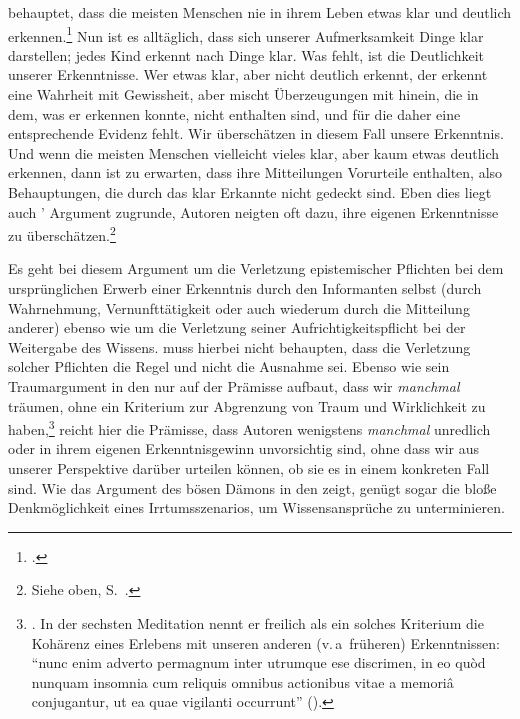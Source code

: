 \begin{nummerierung}
  behauptet, dass die meisten Menschen nie in ihrem Leben etwas
 klar und deutlich
 erkennen.\footnote{\cite[Vgl.][VIII: 22]{Descartes:OeuvresdeDescartes1983}.}
 Nun ist es alltäglich, dass sich unserer Aufmerksamkeit Dinge klar darstellen; jedes Kind erkennt nach
  Dinge klar. Was fehlt, ist die Deutlichkeit unserer
 Erkenntnisse. Wer etwas klar, aber nicht deutlich erkennt, der erkennt eine
 Wahrheit mit Gewissheit, aber mischt Überzeugungen mit hinein, die in dem, was
 er erkennen konnte, nicht enthalten sind, und für die daher eine entsprechende
 Evidenz fehlt. Wir überschätzen in diesem Fall unsere Erkenntnis. Und wenn die
 meisten Menschen vielleicht vieles klar, aber kaum etwas deutlich erkennen,
 dann ist zu erwarten, dass ihre Mitteilungen Vorurteile enthalten, also
 Behauptungen, die durch das klar Erkannte nicht gedeckt sind. Eben dies liegt
 auch ' Argument zugrunde, Autoren neigten oft dazu, ihre
 eigenen Erkenntnisse zu überschätzen.\footnote{Siehe oben,
 S.~\pageref{Abschnitt:DescartesunddieUeberinterpretation}.}
 
 Es geht bei diesem Argument um die Verletzung epistemischer Pflichten bei dem
 ursprünglichen Erwerb einer Erkenntnis durch den Informanten selbst (durch
 Wahrnehmung, Vernunfttätigkeit oder auch wiederum durch die Mitteilung anderer)
 ebenso wie um die Verletzung seiner Aufrichtigkeitspflicht bei der Weitergabe
 des Wissens.  muss hierbei nicht behaupten, dass die
 Verletzung solcher Pflichten die Regel und nicht die Ausnahme sei. Ebenso wie sein
 Traumargument in den  nur auf der
 Prämisse aufbaut, dass wir \emph{manchmal} träumen, ohne ein Kriterium zur
 Abgrenzung von Traum und Wirklichkeit zu
 haben,\footnote{\label{Anmerkung:KriteriumzurUnterscheidungTraumWirklichkeitbeiDescartes}\cite[Vgl.][VII:
 19.8--23]{Descartes:OeuvresdeDescartes1983}. In der sechsten Meditation nennt
 er freilich als ein solches Kriterium die Kohärenz eines Erlebens mit unseren
 anderen (v.\,a~früheren) Erkenntnissen: \enquote{nunc enim
 adverto permagnum inter utrumque ese discrimen, in eo qu{\`o}d nunquam
 insomnia cum reliquis omnibus actionibus vitae a memori{\^a} conjugantur, ut
 ea quae vigilanti occurrunt} \mkbibparens{\cite[][VII: 89.21--25]{Descartes:OeuvresdeDescartes1983}}.} reicht hier die
 Prämisse, dass Autoren wenigstens \emph{manchmal} unredlich oder in ihrem eigenen Erkenntnisgewinn
 unvorsichtig sind, ohne dass wir aus unserer Perspektive darüber urteilen
 können, ob sie es in einem konkreten Fall sind. Wie das Argument des bösen
 Dämons in den  zeigt, genügt sogar die bloße
 Denkmöglichkeit eines Irrtumsszenarios, um Wissensansprüche zu unterminieren.
 

\end{nummerierung}
